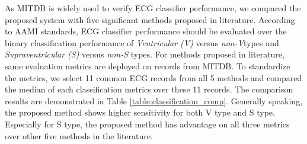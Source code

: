 \begin{table}[b]
\centering
\caption{Classification Performance and Within-Set Variation of Proposed System}
\label{table:variation}
\end{table}

As MITDB is widely used to verify ECG classifier performance, we compared the proposed system with five significant methods proposed in literature. According to AAMI standards, ECG classifier performance should be evaluated over the binary classification performance of \textit{Ventricular (V)} versus \textit{non-V}types and \textit{Supraventricular (S)} versus \textit{non-S} types. For methods proposed in literature, same evaluation metrics are deployed on records from MITDB. To standardize the metrics, we select 11 common ECG records from all 5 methods and compared the median of each classification metrics over these 11 records. The comparison results are demonstrated in Table \ref{table:classification_comp}. Generally speaking, the proposed method shows higher sensitivity for both V type and S type. Especially for S type, the proposed method has advantage on all three metrics over other five methods in the literature.


